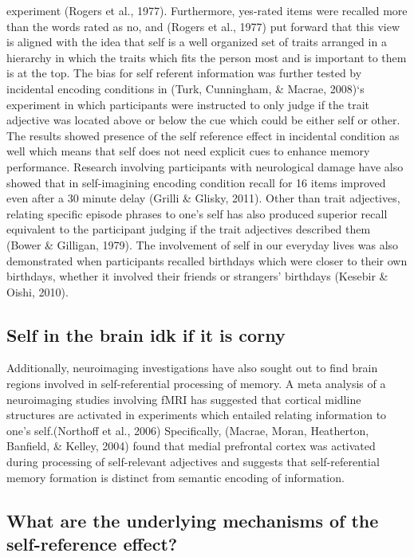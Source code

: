 \documentclass[
  man,floatsintext]{apa6}
\begin{document}
experiment (Rogers et al., 1977). Furthermore, yes-rated items were recalled more than the words rated as no, and (Rogers et al., 1977) put forward that this view is aligned with the idea that self is a well organized set of traits arranged in a hierarchy in which the traits which fits the person most and is important to them is at the top. The bias for self referent information was further tested by incidental encoding conditions in (Turk, Cunningham, \& Macrae, 2008)`s experiment in which participants were instructed to only judge if the trait adjective was located above or below the cue which could be either self or other. The results showed presence of the self reference effect in incidental condition as well which means that self does not need explicit cues to enhance memory performance. Research involving participants with neurological damage have also showed that in self-imagining encoding condition recall for 16 items improved even after a 30 minute delay (Grilli \& Glisky, 2011). Other than trait adjectives, relating specific episode phrases to one's self has also produced superior recall equivalent to the participant judging if the trait adjectives described them (Bower \& Gilligan, 1979). The involvement of self in our everyday lives was also demonstrated when participants recalled birthdays which were closer to their own birthdays, whether it involved their friends or strangers' birthdays (Kesebir \& Oishi, 2010).

\hypertarget{self-in-the-brain-idk-if-it-is-corny}{%
\subsection{Self in the brain idk if it is corny}\label{self-in-the-brain-idk-if-it-is-corny}}

Additionally, neuroimaging investigations have also sought out to find brain regions involved in self-referential processing of memory. A meta analysis of a neuroimaging studies involving fMRI has suggested that cortical midline structures are activated in experiments which entailed relating information to one's self.(Northoff et al., 2006) Specifically, (Macrae, Moran, Heatherton, Banfield, \& Kelley, 2004) found that medial prefrontal cortex was activated during processing of self-relevant adjectives and suggests that self-referential memory formation is distinct from semantic encoding of information.

\hypertarget{what-are-the-underlying-mechanisms-of-the-self-reference-effect}{%
\subsection{What are the underlying mechanisms of the self-reference effect?}\label{what-are-the-underlying-mechanisms-of-the-self-reference-effect}}
\end{document}

